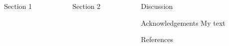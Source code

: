 \documentclass[t, final]{beamer}
\begin{document}
\begin{frame}{}
\begin{columns}[t]
\begin{column}{.32\linewidth}
\begin{block}{Section 1}
  \blinditemize
\end{block}
\end{column}


\begin{column}{.32\linewidth}
\begin{block}{Section 2}
  \blindtext
\end{block}
\end{column}


\begin{column}{.32\linewidth}
\begin{block}{Discussion}
  \blindtext
\end{block}

\begin{block}{Acknowledgements}
  My text

  \blinditemize
\end{block}

\begin{block}{References}
  \blinditemize
\end{block}
\end{column}
\end{columns}

\end{frame}
\end{document}

